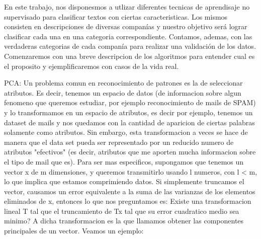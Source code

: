 En este trabajo, nos disponesmos a utlizar diferentes tecnicas de aprendisaje no supervisado para clasificar textos con ciertas caracteristicas. Los mismos consisten en descripciones de diversas companías y nuestro objetivo será lograr clasificar cada una en una categoria correspondiente. Contamos, ademas, con las verdaderas categorias de cada companía para realizar una validación de los datos.
Comenzaremos con una breve descripcion de los algoritmos para entender cual es el proposito y ejemplificaremos con casos de la vida real.

PCA:
Un problema comun en reconocimiento de patrones es la de seleccionar atributos. Es decir, tenemos un espacio de datos (de informacion sobre algun fenomeno que queremos estudiar, por ejemplo reconocimiento de mails de SPAM) y lo transformamos en un espacio de atributos, es decir por ejemplo, tenemos un dataset de mails y nos quedamos con la cantidad de aparicion de ciertas palabras solamente como atributos. Sin embargo, esta transformacion a veces se hace de manera que el data set pueda ser representado por un reducido numero de atributos "efectivos" (es decir, atributos que me aporten mucha informacion sobre el tipo de mail que es). Para ser mas especificos, supongamos que tenemos un vector x de m dimensiones, y queremos transmitirlo usando l numeros, con l < m, lo que implica que estamos comprimiendo datos. Si simplemente truncamos el vector, causamos un error equivalente a la suma de las varianzas de los elementos eliminados de x, entonces lo que nos preguntamos es: Existe una transformacion lineal T tal que el truncamiento de Tx tal que su error cuadratico medio sea minimo? A dicha transformacion es la que llamamos obtener las componentes principales de un vector. Veamos un ejemplo:


